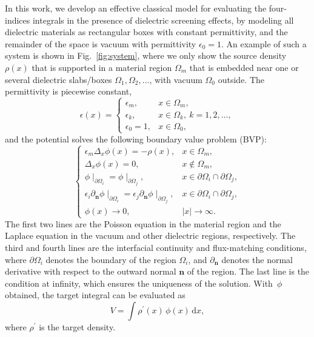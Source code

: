 \documentclass[preprint,12pt]{elsarticle}
\newcommand{\V}[1]{\boldsymbol{#1}}
\newcommand{\abs}[1]{\left|#1\right|}
\begin{document}
In this work, we develop an effective classical model for evaluating the four-indices integrals in the presence of dielectric screening effects, by modeling all dielectric materials as rectangular boxes with constant permittivity, and the remainder of the space is vacuum with permittivity $\epsilon_0 = 1$.
An example of such a system is shown in Fig.~\ref{fig:system}, where we only show the source density $\rho(x)$ that is supported in a material region $\Omega_m$ that is embedded near one or several dielectric slabs/boxes $\Omega_1, \Omega_2, \dots$, with vacuum $\Omega_0$ outside.
The permittivity is piecewise constant,
\begin{equation}
    \epsilon(x) = \begin{cases}
        \epsilon_m, & x \in \Omega_m,\\
        \epsilon_k, & x \in \Omega_k,\ k=1,2,\dots,\\
        \epsilon_0 = 1, & x \in \Omega_0,
    \end{cases}
\end{equation}
and the potential solves the following boundary value problem (BVP):
\begin{equation}\label{eq:bvp}
    \begin{cases}
        \epsilon_m \Delta_x \phi(x) = -\rho(x), & x \in \Omega_m,\\
        \Delta_x \phi(x) = 0, & x \notin \Omega_m,\\
        \phi\mid_{\partial \Omega_i} = \phi\mid_{\partial \Omega_j}, &
            x \in \partial\Omega_i \cap \partial\Omega_j,\\
        \epsilon_i \partial_{\V n} \phi\mid_{\partial \Omega_i}
            = \epsilon_j \partial_{\V n} \phi\mid_{\partial \Omega_j}, &
            x \in \partial\Omega_i \cap \partial\Omega_j,\\
        \phi(x) \to 0, & \abs{x} \to \infty.
    \end{cases}
\end{equation}
The first two lines are the Poisson equation in the material region and the Laplace equation in the vacuum and other dielectric regions, respectively.
The third and fourth lines are the interfacial continuity and flux-matching conditions, where $\partial\Omega_i$ denotes the boundary of the region $\Omega_i$, and $\partial_{\V n}$ denotes the normal derivative with respect to the outward normal $\V n$ of the region.
The last line is the condition at infinity, which ensures the uniqueness of the solution.
With~$\phi$ obtained, the target integral can be evaluated as
\begin{equation}
    V = \int \rho^\prime(x)\, \phi(x)\, \mathrm{d}x,
\end{equation}
where $\rho^\prime$ is the target density.
\end{document}
